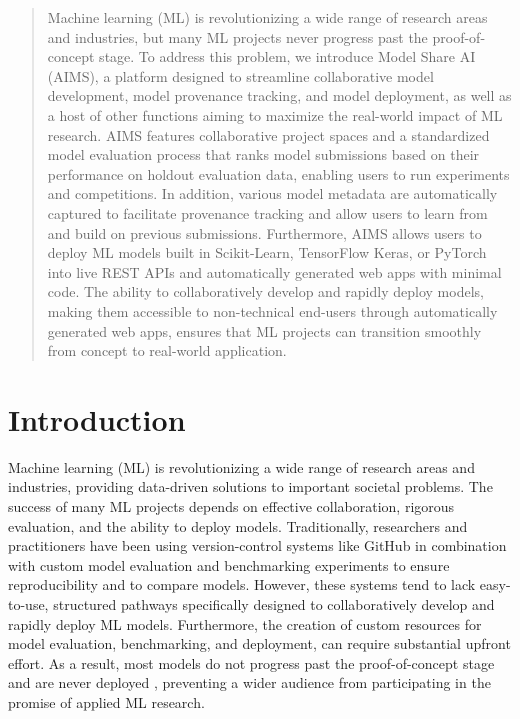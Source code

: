 \begin{abstract}
Machine learning (ML) is revolutionizing a wide range of research areas and industries, but many ML projects never progress past the proof-of-concept stage. To address this problem, we introduce Model Share AI (AIMS), a platform designed to streamline collaborative model development, model provenance tracking, and model deployment, as well as a host of other functions aiming to maximize the real-world impact of ML research. AIMS features collaborative project spaces and a standardized model evaluation process that ranks model submissions based on their performance on holdout evaluation data, enabling users to run experiments and competitions. In addition, various model metadata are automatically captured to facilitate provenance tracking and allow users to learn from and build on previous submissions. Furthermore, AIMS allows users to deploy ML models built in Scikit-Learn, TensorFlow Keras, or PyTorch into live REST APIs and automatically generated web apps with minimal code. The ability to collaboratively develop and rapidly deploy models, making them accessible to non-technical end-users through automatically generated web apps, ensures that ML projects can transition smoothly from concept to real-world application.

\end{abstract}

\section{Introduction}
Machine learning (ML) is revolutionizing a wide range of research areas and industries, providing data-driven solutions to important societal problems. The success of many ML projects depends on effective collaboration, rigorous evaluation, and the ability to deploy models. Traditionally, researchers and practitioners have been using version-control systems like GitHub in combination with custom model evaluation and benchmarking experiments to ensure reproducibility and to compare models. However, these systems tend to lack easy-to-use, structured pathways specifically designed to collaboratively develop and rapidly deploy ML models. Furthermore, the creation of custom resources for model evaluation, benchmarking, and deployment, can require substantial upfront effort. As a result, most models do not progress past the proof-of-concept stage and are never deployed \citep{davenport_is_2022, siegel_models_2022}, preventing a wider audience from participating in the promise of applied ML research.

